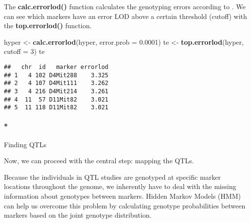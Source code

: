 \documentclass[12pt,]{krantz}
\makeatletter
\newenvironment{Shaded}{\begin{snugshade}}{\end{snugshade}}
\newcommand{\KeywordTok}[1]{\textcolor[rgb]{0.27,0.27,0.27}{\textbf{{#1}}}}
\newcommand{\DataTypeTok}[1]{\textcolor[rgb]{0.27,0.27,0.27}{{#1}}}
\newcommand{\DecValTok}[1]{\textcolor[rgb]{0.06,0.06,0.06}{{#1}}}
\newcommand{\FloatTok}[1]{\textcolor[rgb]{0.06,0.06,0.06}{{#1}}}
\newcommand{\StringTok}[1]{\textcolor[rgb]{0.5,0.5,0.5}{{#1}}}
\newcommand{\OtherTok}[1]{\textcolor[rgb]{0.37,0.37,0.37}{{#1}}}
\newcommand{\NormalTok}[1]{{#1}}
\let\oldparagraph\paragraph
\renewcommand{\paragraph}[1]{\oldparagraph{#1}\mbox{}}
\newenvironment{kframe}{%
\medskip{}
\setlength{\fboxsep}{.8em}
 \def\at@end@of@kframe{}%
 \ifinner\ifhmode%
  \def\at@end@of@kframe{\end{minipage}}%
  \begin{minipage}{\columnwidth}%
 \fi\fi%
 \def\FrameCommand##1{\hskip\@totalleftmargin \hskip-\fboxsep
 \colorbox{shadecolor}{##1}\hskip-\fboxsep
     \hskip-\linewidth \hskip-\@totalleftmargin \hskip\columnwidth}%
 \MakeFramed {\advance\hsize-\width
   \@totalleftmargin\z@ \linewidth\hsize
   \@setminipage}}%
 {\par\unskip\endMakeFramed%
 \at@end@of@kframe}
\renewenvironment{Shaded}{\begin{kframe}}{\end{kframe}}
\makeatother
\begin{document}
The \textbf{calc.errorlod()} function calculates the genotyping errors
according to \citet{Lincoln1992604}. We can see which markers have an
error LOD above a certain threshold (cutoff) with the
\textbf{top.errorlod()} function.

\begin{Shaded}
\begin{Highlighting}[]
\NormalTok{hyper <-}\StringTok{ }\KeywordTok{calc.errorlod}\NormalTok{(hyper, }\DataTypeTok{error.prob =} \FloatTok{0.0001}\NormalTok{)}
\NormalTok{te <-}\StringTok{ }\KeywordTok{top.errorlod}\NormalTok{(hyper, }\DataTypeTok{cutoff =} \DecValTok{3}\NormalTok{)}
\NormalTok{te}
\end{Highlighting}
\end{Shaded}

\begin{verbatim}
##   chr  id   marker errorlod
## 1   4 102 D4Mit288    3.325
## 2   4 107 D4Mit111    3.262
## 3   4 216 D4Mit214    3.261
## 4  11  57 D11Mit82    3.021
## 5  11 118 D11Mit82    3.021
\end{verbatim}

\begin{Shaded}
\end{Shaded}

\paragraph*{Finding QTLs}\label{finding-qtls}

Now, we can proceed with the central step: mapping the QTLs.

Because the individuals in QTL studies are genotyped at specific marker
locations throughout the genome, we inherently have to deal with the
missing information about genotypes between markers. Hidden Markov
Models (HMM) can help us overcome this problem by calculating genotype
probabilities between markers based on the joint genotype distribution.
\end{document}
